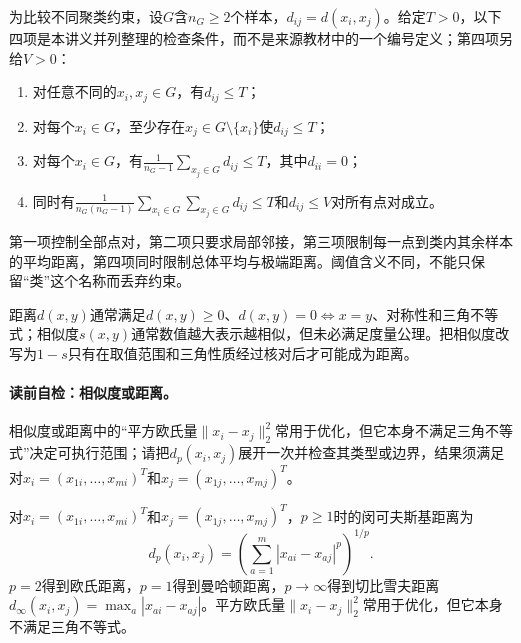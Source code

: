 \begin{keypointbox}[title=工作性检查表：四种类内阈值]
为比较不同聚类约束，设$G$含$n_G\geq2$个样本，$d_{ij}=d(x_i,x_j)$。给定$T>0$，以下四项是本讲义并列整理的检查条件，而不是来源教材中的一个编号定义；第四项另给$V>0$：
\begin{enumerate}[leftmargin=2.2em]
  \item 对任意不同的$x_i,x_j\in G$，有$d_{ij}\leq T$；
  \item 对每个$x_i\in G$，至少存在$x_j\in G\setminus\{x_i\}$使$d_{ij}\leq T$；
  \item 对每个$x_i\in G$，有$\frac1{n_G-1}\sum_{x_j\in G}d_{ij}\leq T$，其中$d_{ii}=0$；
  \item 同时有$\frac1{n_G(n_G-1)}\sum_{x_i\in G}\sum_{x_j\in G}d_{ij}\leq T$和$d_{ij}\leq V$对所有点对成立。
\end{enumerate}
第一项控制全部点对，第二项只要求局部邻接，第三项限制每一点到类内其余样本的平均距离，第四项同时限制总体平均与极端距离。阈值含义不同，不能只保留“类”这个名称而丢弃约束。
\end{keypointbox}

\begin{definition}[距离与相似度]\label{def:V4-C02-distance-similarity}
距离$d(x,y)$通常满足$d(x,y)\geq0$、$d(x,y)=0\Leftrightarrow x=y$、对称性和三角不等式；相似度$s(x,y)$通常数值越大表示越相似，但未必满足度量公理。把相似度改写为$1-s$只有在取值范围和三角性质经过核对后才可能成为距离。
\end{definition}

\paragraph{读前自检：相似度或距离。}相似度或距离中的“平方欧氏量$\|x_i-x_j\|_2^2$常用于优化，但它本身不满足三角不等式”决定可执行范围；请把$d_p(x_i,x_j)$展开一次并检查其类型或边界，结果须满足对$x_i=(x_{1i},\ldots,x_{mi})^T$和$x_j=(x_{1j},\ldots,x_{mj})^T$。\par

对$x_i=(x_{1i},\ldots,x_{mi})^T$和$x_j=(x_{1j},\ldots,x_{mj})^T$，$p\geq1$时的闵可夫斯基距离为
\[
d_p(x_i,x_j)=\left(\sum_{a=1}^{m}|x_{ai}-x_{aj}|^p\right)^{1/p}.
\]
$p=2$得到欧氏距离，$p=1$得到曼哈顿距离，$p\to\infty$得到切比雪夫距离$d_\infty(x_i,x_j)=\max_a|x_{ai}-x_{aj}|$。平方欧氏量$\|x_i-x_j\|_2^2$常用于优化，但它本身不满足三角不等式。

